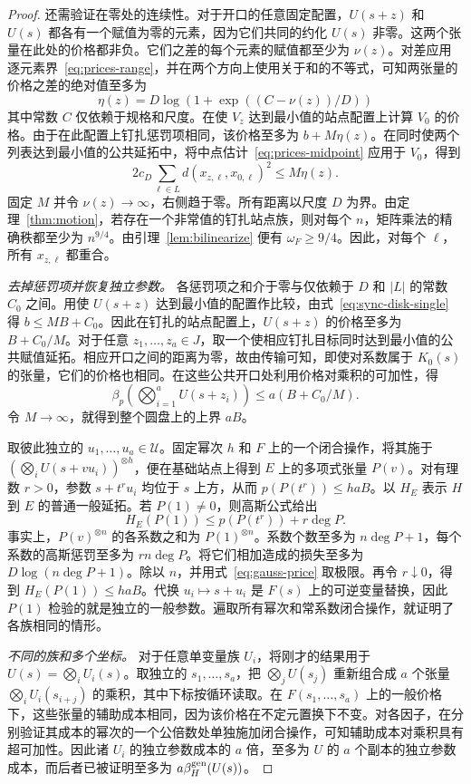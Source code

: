 \begin{proof}
还需验证在零处的连续性。对于开口的任意固定配置，$U(s+z)$ 和 $U(s)$ 都各有一个赋值为零的元素，因为它们共同的约化 $U(s)$ 非零。这两个张量在此处的价格都非负。它们之差的每个元素的赋值都至少为 $\nu(z)$。对差应用逐元素界~\eqref{eq:prices-range}，并在两个方向上使用关于和的不等式，可知两张量的价格之差的绝对值至多为
\[
      \eta(z)=D\log\!\left(1+\exp((C-\nu(z))/D)\right)
\]
其中常数 $C$ 仅依赖于规格和尺度。在使 $V_z$ 达到最小值的站点配置上计算 $V_0$ 的价格。由于在此配置上钉扎惩罚项相同，该价格至多为 $b+M\eta(z)$。在同时使两个列表达到最小值的公共延拓中，将中点估计~\eqref{eq:prices-midpoint} 应用于 $V_0$，得到
\[
  2c_D\sum_{\ell\in L}d(x_{z,\ell},x_{0,\ell})^2 \le M\eta(z).
\]
固定 $M$ 并令 $\nu(z)\to\infty$，右侧趋于零。所有距离以尺度 $D$ 为界。由定理~\ref{thm:motion}，若存在一个非常值的钉扎站点族，则对每个 $n$，矩阵乘法的精确秩都至少为 $n^{9/4}$。由引理~\ref{lem:bilinearize} 便有 $\omega_F\ge9/4$。因此，对每个 $\ell$，所有 $x_{z,\ell}$ 都重合。

\smallskip\noindent\emph{去掉惩罚项并恢复独立参数。}
各惩罚项之和介于零与仅依赖于 $D$ 和 $|L|$ 的常数 $C_0$ 之间。用使 $U(s+z)$ 达到最小值的配置作比较，由式~\eqref{eq:sync-disk-single} 得 $b\le MB+C_0$。因此在钉扎的站点配置上，$U(s+z)$ 的价格至多为 $B+C_0/M$。对于任意 $z_1,\ldots,z_a\in J$，取一个使相应钉扎目标同时达到最小值的公共赋值延拓。相应开口之间的距离为零，故由传输可知，即使对系数属于 $K_0(s)$ 的张量，它们的价格也相同。在这些公共开口处利用价格对乘积的可加性，得
\[
  \beta_p\!\left(\bigotimes_{i=1}^aU(s+z_i)\right)
       \le a(B+C_0/M).
\]
令 $M\to\infty$，就得到整个圆盘上的上界 $aB$。

取彼此独立的 $u_1,\ldots,u_a\in\mathcal U$。固定幂次 $h$ 和 $F$ 上的一个闭合操作，将其施于 $(\bigotimes_i U(s+v u_i))^{\otimes h}$，便在基础站点上得到 $E$ 上的多项式张量 $P(v)$。对有理数 $r>0$，参数 $s+t^r u_i$ 均位于 $s$ 上方，从而 $p(P(t^r))\le haB$。以 $H_E$ 表示 $H$ 到 $E$ 的普通一般延拓。若 $P(1)\ne0$，则高斯公式给出
\[
                 H_E(P(1))\le p(P(t^r))+r\deg P .
\]
事实上，$P(v)^{\otimes n}$ 的各系数之和为 $P(1)^{\otimes n}$。系数个数至多为 $n\deg P+1$，每个系数的高斯惩罚至多为 $rn\deg P$。将它们相加造成的损失至多为 $D\log(n\deg P+1)$。除以 $n$，并用式~\eqref{eq:gauss-price} 取极限。再令 $r\downarrow0$，得到 $H_E(P(1))\le haB$。代换 $u_i\mapsto s+u_i$ 是 $F(s)$ 上的可逆变量替换，因此 $P(1)$ 检验的就是独立的一般参数。遍取所有幂次和常系数闭合操作，就证明了各族相同的情形。

\smallskip\noindent\emph{不同的族和多个坐标。}
对于任意单变量族 $U_i$，将刚才的结果用于 $U(s)=\bigotimes_iU_i(s)$。取独立的 $s_1,\ldots,s_a$，把 $\bigotimes_jU(s_j)$ 重新组合成 $a$ 个张量 $\bigotimes_i U_i(s_{i+j})$ 的乘积，其中下标按循环读取。在 $F(s_1,\ldots,s_a)$ 上的一般价格下，这些张量的辅助成本相同，因为该价格在不定元置换下不变。对各因子，在分别验证其成本的幂次的一个公倍数处单独施加闭合操作，可知辅助成本对乘积具有超可加性。因此诸 $U_i$ 的独立参数成本的 $a$ 倍，至多为 $U$ 的 $a$ 个副本的独立参数成本，而后者已被证明至多为 $a\beta_H^{\rm gen}(U(s))$。


\end{proof}
